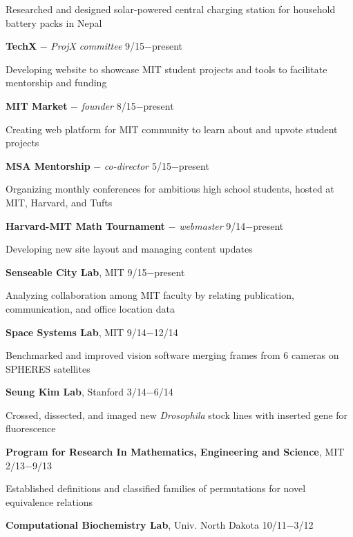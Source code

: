 \documentclass[11pt]{article}
\newcommand{\msection}[1]{\vspace{1em}\marginnote{#1}} %
\newcommand{\bt}[1]{\textbf{#1}} %
\newcommand{\gap}[0]{\vspace{0.5em}} %
\newcommand{\dash}[0]{ $-$ } %
\begin{document}
Researched and designed solar-powered central charging station for household battery packs in Nepal





\msection{Leadership}
\bt{TechX}\dash \emph{ProjX committee} \hfill 9/15$-$present

Developing website to showcase MIT student projects and tools to facilitate mentorship and funding

\gap

\bt{MIT Market}\dash \emph{founder} \hfill 8/15$-$present

Creating web platform for MIT community to learn about and upvote student projects

\gap

\bt{MSA Mentorship}\dash \emph{co-director} \hfill 5/15$-$present

Organizing monthly conferences for ambitious high school students, hosted at MIT, Harvard, and Tufts

\gap

\bt{Harvard-MIT Math Tournament}\dash \emph{webmaster} \hfill 9/14$-$present

Developing new site layout and managing content updates


\msection{Research}

\bt{Senseable City Lab}, MIT \hfill 9/15$-$present

Analyzing collaboration among MIT faculty by relating publication, communication, and office location data

\gap

\bt{Space Systems Lab}, MIT \hfill 9/14$-$12/14

Benchmarked and improved vision software merging frames from 6 cameras on SPHERES satellites

\gap

\bt{Seung Kim Lab}, Stanford \hfill 3/14$-$6/14

Crossed, dissected, and imaged new \emph{Drosophila} stock lines with inserted gene for fluorescence

\gap

\bt{Program for Research In Mathematics, Engineering and Science}, MIT \hfill 2/13$-$9/13

Established definitions and classified families of permutations for novel equivalence relations

\gap

\bt{Computational Biochemistry Lab}, Univ. North Dakota \hfill 10/11$-$3/12
\end{document}
